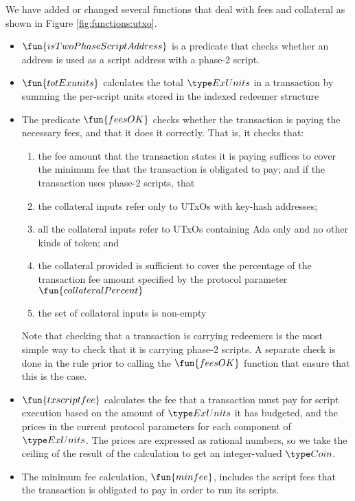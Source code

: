 We have added or changed several functions that deal with fees and collateral as shown in Figure \ref{fig:functions:utxo}.

\begin{itemize}
  \item $\fun{isTwoPhaseScriptAddress}$ is a predicate that checks
  whether an address is used as a script address with a phase-2
  script.
  \item $\fun{totExunits}$ calculates the total $\ExUnits$ in a transaction by summing
  the per-script units stored in the indexed redeemer structure
  \item The predicate $\fun{feesOK}$ checks whether the transaction is
  paying the necessary fees, and that it does it correctly. That is, it checks that:
  \begin{enumerate}[label=({\roman*})]
    \item the fee amount that the transaction states it is paying suffices to cover
    the minimum fee that the transaction is obligated to pay; and if the transaction uses phase-2 scripts, that
    \item the collateral inputs refer only to UTxOs with key-hash addresses;
    \item all the collateral inputs refer to UTxOs containing Ada only and no other kinds of token; and
    \item the collateral provided is sufficient to cover the percentage of the
    transaction fee amount specified by the protocol parameter $\fun{collateralPercent}$
    \item the set of collateral inputs is non-empty
  \end{enumerate}
  Note that checking that a transaction is carrying redeemers is the most simple way to
  check that it is carrying phase-2 scripts. A separate check is done in the rule prior to
  calling the $\fun{feesOK}$ function that ensure that this is the case.
  \item $\fun{txscriptfee}$ calculates the fee that a transaction must pay for script
  execution based on the amount of $\ExUnits$ it has budgeted, and the prices in the current protocol parameters
  for each component of $\ExUnits$. The prices are expressed as rational numbers,
  so we take the ceiling of the result of the calculation to get an integer-valued $\Coin$.
  \item The minimum fee calculation, $\fun{minfee}$, includes the script
  fees that the transaction is obligated to pay in order to run its scripts.
\end{itemize}

